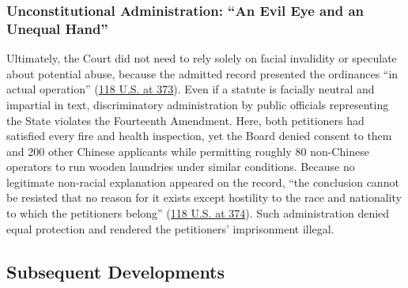\documentclass[12pt]{article}
\begin{document}
\subsubsection{Unconstitutional Administration: ``An Evil Eye and an Unequal Hand''}

Ultimately, the Court did not need to rely solely on facial invalidity or speculate about potential abuse, because the admitted record presented the ordinances ``in actual operation'' (\href{https://supreme.justia.com/cases/federal/us/118/356/}{118 U.S. at 373}). Even if a statute is facially neutral and impartial in text, discriminatory administration by public officials representing the State violates the Fourteenth Amendment. Here, both petitioners had satisfied every fire and health inspection, yet the Board denied consent to them and 200 other Chinese applicants while permitting roughly 80 non-Chinese operators to run wooden laundries under similar conditions. Because no legitimate non-racial explanation appeared on the record, ``the conclusion cannot be resisted that no reason for it exists except hostility to the race and nationality to which the petitioners belong'' (\href{https://supreme.justia.com/cases/federal/us/118/356/}{118 U.S. at 374}). Such administration denied equal protection and rendered the petitioners' imprisonment illegal.

\subsection{Subsequent Developments}
\end{document}
